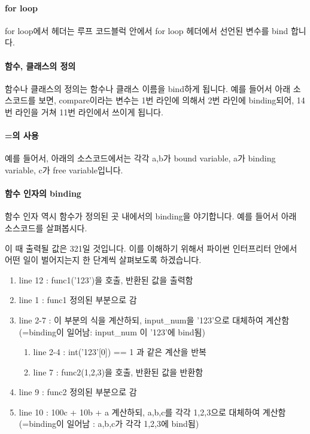 \documentclass[twoside]{article}
\begin{document}
\paragraph{for loop} for loop에서 헤더는 루프 코드블럭 안에서 for loop 헤더에서 선언된 변수를 bind 합니다. 

\paragraph{함수, 클래스의 정의} 함수나 클래스의 정의는 함수나 클래스 이름을 bind하게 됩니다. 예를 들어서 아래 소스코드를 보면, compare이라는 변수는 1번 라인에 의해서 2번 라인에 binding되어, 14번 라인을 거쳐 11번 라인에서 쓰이게 됩니다. 




\paragraph{=의 사용} 

예를 들어서, 아래의 소스코드에서는 각각 a,b가 bound variable, a가 binding variable, c가 free variable입니다. 


\paragraph{함수 인자의 binding} 

함수 인자 역시 함수가 정의된 곳 내에서의 binding을 야기합니다. 예를 들어서 아래 소스코드를 살펴봅시다. 


                
이 때 출력될 값은 321일 것입니다. 이를 이해하기 위해서 파이썬 인터프리터 안에서 어떤 일이 벌어지는지 한 단계씩 살펴보도록 하겠습니다. 

\begin{enumerate} 
\item line 12 : func1('123')을 호출, 반환된 값을 출력함
\item line 1 : func1 정의된 부분으로 감
\item line 2-7 : 이 부분의 식을 계산하되, input\_num을 '123'으로 대체하여 계산함 (=binding이 일어남: input\_num 이 '123'에 bind됨)
\begin{enumerate}
\item line 2-4 : int('123'[0]) == 1 과 같은 계산을 반복 
\item line 7 : func2(1,2,3)을 호출, 반환된 값을 반환함
\end{enumerate}
\item line 9 : func2 정의된 부분으로 감 
\item line 10 : 100c + 10b + a 계산하되, a,b,c를 각각 1,2,3으로 대체하여 계산함 (=binding이 일어남 : a,b,c가 각각 1,2,3에 bind됨)
\end{enumerate}
\end{document}
